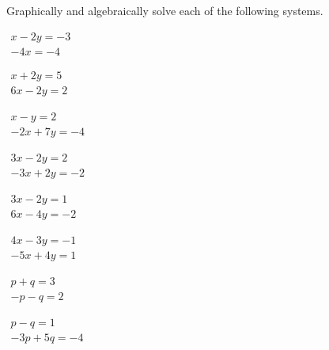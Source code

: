 \begin{exercise}  
Graphically and algebraically solve each of the following systems.

\begin{Parts}
\item\(\begin{array}{l} x-2y=-3\\-4x=-4 \end{array}\)

\begin{reduce}
\item\(\begin{array}{l} x+2y=5\\ 6x -2y=2 \end{array}\)

\item\(\begin{array}{l} x-y=2\\ -2x +7y=-4 \end{array}\)
\end{reduce}

\item\(\begin{array}{l} 3x -2y=2\\ -3x +2y=-2 \end{array}\)

\item\(\begin{array}{l} 3x -2y=1\\ 6x -4y=-2 \end{array}\)

\item\(\begin{array}{l} 4x -3y=-1\\ -5x +4y=1 \end{array}\)

\item\(\begin{array}{l} p +q=3\\ -p-q=2 \end{array}\)

\begin{reduce}
\item\(\begin{array}{l} p -q=1\\ -3p +5q=-4 \end{array}\)


\end{reduce}
\end{Parts}
\end{exercise}
